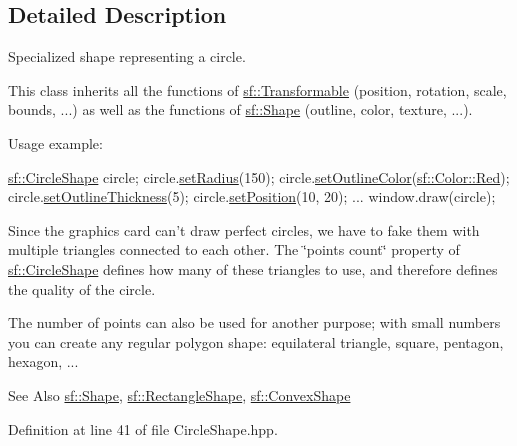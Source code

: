 \subsection{Detailed Description}
Specialized shape representing a circle. 

This class inherits all the functions of \hyperlink{classsf_1_1Transformable}{sf\-::\-Transformable} (position, rotation, scale, bounds, ...) as well as the functions of \hyperlink{classsf_1_1Shape}{sf\-::\-Shape} (outline, color, texture, ...).

Usage example\-: 
\begin{DoxyCode}
\hyperlink{classsf_1_1CircleShape}{sf::CircleShape} circle;
circle.\hyperlink{classsf_1_1CircleShape_a21cdf85fc2f201e10222a241af864be0}{setRadius}(150);
circle.\hyperlink{classsf_1_1Shape_a5978f41ee349ac3c52942996dcb184f7}{setOutlineColor}(\hyperlink{classsf_1_1Color_a127dbf55db9c07d0fa8f4bfcbb97594a}{sf::Color::Red});
circle.\hyperlink{classsf_1_1Shape_a5ad336ad74fc1f567fce3b7e44cf87dc}{setOutlineThickness}(5);
circle.\hyperlink{classsf_1_1Transformable_a4dbfb1a7c80688b0b4c477d706550208}{setPosition}(10, 20);
...
window.draw(circle);
\end{DoxyCode}


Since the graphics card can't draw perfect circles, we have to fake them with multiple triangles connected to each other. The \char`\"{}points count\char`\"{} property of \hyperlink{classsf_1_1CircleShape}{sf\-::\-Circle\-Shape} defines how many of these triangles to use, and therefore defines the quality of the circle.

The number of points can also be used for another purpose; with small numbers you can create any regular polygon shape\-: equilateral triangle, square, pentagon, hexagon, ...

\begin{DoxySeeAlso}{See Also}
\hyperlink{classsf_1_1Shape}{sf\-::\-Shape}, \hyperlink{classsf_1_1RectangleShape}{sf\-::\-Rectangle\-Shape}, \hyperlink{classsf_1_1ConvexShape}{sf\-::\-Convex\-Shape} 
\end{DoxySeeAlso}


Definition at line 41 of file Circle\-Shape.\-hpp.



